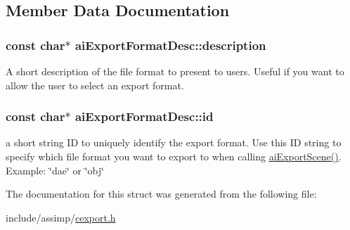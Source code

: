 \subsection{\-Member \-Data \-Documentation}
\hypertarget{structaiExportFormatDesc_a9c84c4b07c5177fb6539b9bdf90236fb}{
\subsubsection[{description}]{\setlength{\rightskip}{0pt plus 5cm}const char$\ast$ {\bf ai\-Export\-Format\-Desc\-::description}}}\label{structaiExportFormatDesc_a9c84c4b07c5177fb6539b9bdf90236fb}
\-A short description of the file format to present to users. \-Useful if you want to allow the user to select an export format. \hypertarget{structaiExportFormatDesc_afe216eaea3a04abca041e5c253f94bbf}{
\subsubsection[{id}]{\setlength{\rightskip}{0pt plus 5cm}const char$\ast$ {\bf ai\-Export\-Format\-Desc\-::id}}}\label{structaiExportFormatDesc_afe216eaea3a04abca041e5c253f94bbf}
a short string \-I\-D to uniquely identify the export format. \-Use this \-I\-D string to specify which file format you want to export to when calling \hyperlink{cexport_8h_a9615510b8430a9da4f435a72148128dd}{ai\-Export\-Scene()}. \-Example\-: \char`\"{}dae\char`\"{} or \char`\"{}obj\char`\"{} 

\-The documentation for this struct was generated from the following file\-:\begin{DoxyCompactItemize}
\item 
include/assimp/\hyperlink{cexport_8h}{cexport.\-h}\end{DoxyCompactItemize}
